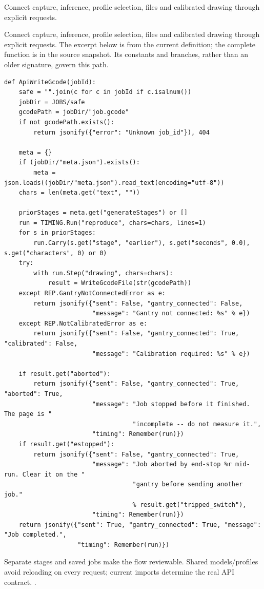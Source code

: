 Connect capture, inference, profile selection, files and calibrated drawing through explicit requests.


Connect capture, inference, profile selection, files and calibrated drawing through explicit requests. The excerpt below is from the current definition; the complete function is in the source snapshot. Its constants and branches, rather than an older signature, govern this path.


\begin{lstlisting}[style=plain]
def ApiWriteGcode(jobId):
    safe = "".join(c for c in jobId if c.isalnum())
    jobDir = JOBS/safe
    gcodePath = jobDir/"job.gcode"
    if not gcodePath.exists():
        return jsonify({"error": "Unknown job_id"}), 404

    meta = {}
    if (jobDir/"meta.json").exists():
        meta = json.loads((jobDir/"meta.json").read_text(encoding="utf-8"))
    chars = len(meta.get("text", ""))

    priorStages = meta.get("generateStages") or []
    run = TIMING.Run("reproduce", chars=chars, lines=1)
    for s in priorStages:
        run.Carry(s.get("stage", "earlier"), s.get("seconds", 0.0), s.get("characters", 0) or 0)
    try:
        with run.Step("drawing", chars=chars):
            result = WriteGcodeFile(str(gcodePath))
    except REP.GantryNotConnectedError as e:
        return jsonify({"sent": False, "gantry_connected": False,
                        "message": "Gantry not connected: %s" % e})
    except REP.NotCalibratedError as e:
        return jsonify({"sent": False, "gantry_connected": True, "calibrated": False,
                        "message": "Calibration required: %s" % e})

    if result.get("aborted"):
        return jsonify({"sent": False, "gantry_connected": True, "aborted": True,
                        "message": "Job stopped before it finished. The page is "
                                   "incomplete -- do not measure it.",
                        "timing": Remember(run)})
    if result.get("estopped"):
        return jsonify({"sent": False, "gantry_connected": True,
                        "message": "Job aborted by end-stop %r mid-run. Clear it on the "
                                   "gantry before sending another job."
                                   % result.get("tripped_switch"),
                        "timing": Remember(run)})
    return jsonify({"sent": True, "gantry_connected": True, "message": "Job completed.",
                    "timing": Remember(run)})
\end{lstlisting}
Separate stages and saved jobs make the flow reviewable. Shared models/profiles avoid reloading on every request; current imports determine the real API contract. \cite{flaskdocs,pillowops,code2026}.


